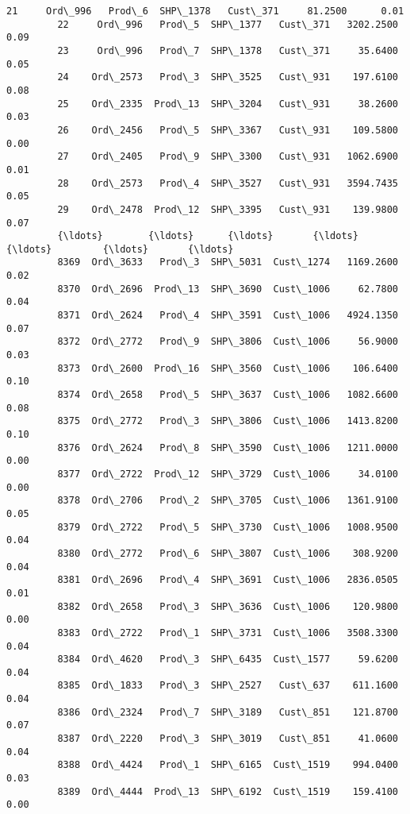 \documentclass[11pt]{article}
\begin{document}
\begin{Verbatim}[commandchars=\\\{\}]
         21     Ord\_996   Prod\_6  SHP\_1378   Cust\_371     81.2500      0.01   
         22     Ord\_996   Prod\_5  SHP\_1377   Cust\_371   3202.2500      0.09   
         23     Ord\_996   Prod\_7  SHP\_1378   Cust\_371     35.6400      0.05   
         24    Ord\_2573   Prod\_3  SHP\_3525   Cust\_931    197.6100      0.08   
         25    Ord\_2335  Prod\_13  SHP\_3204   Cust\_931     38.2600      0.03   
         26    Ord\_2456   Prod\_5  SHP\_3367   Cust\_931    109.5800      0.00   
         27    Ord\_2405   Prod\_9  SHP\_3300   Cust\_931   1062.6900      0.01   
         28    Ord\_2573   Prod\_4  SHP\_3527   Cust\_931   3594.7435      0.05   
         29    Ord\_2478  Prod\_12  SHP\_3395   Cust\_931    139.9800      0.07   
         {\ldots}        {\ldots}      {\ldots}       {\ldots}        {\ldots}         {\ldots}       {\ldots}   
         8369  Ord\_3633   Prod\_3  SHP\_5031  Cust\_1274   1169.2600      0.02   
         8370  Ord\_2696  Prod\_13  SHP\_3690  Cust\_1006     62.7800      0.04   
         8371  Ord\_2624   Prod\_4  SHP\_3591  Cust\_1006   4924.1350      0.07   
         8372  Ord\_2772   Prod\_9  SHP\_3806  Cust\_1006     56.9000      0.03   
         8373  Ord\_2600  Prod\_16  SHP\_3560  Cust\_1006    106.6400      0.10   
         8374  Ord\_2658   Prod\_5  SHP\_3637  Cust\_1006   1082.6600      0.08   
         8375  Ord\_2772   Prod\_3  SHP\_3806  Cust\_1006   1413.8200      0.10   
         8376  Ord\_2624   Prod\_8  SHP\_3590  Cust\_1006   1211.0000      0.00   
         8377  Ord\_2722  Prod\_12  SHP\_3729  Cust\_1006     34.0100      0.00   
         8378  Ord\_2706   Prod\_2  SHP\_3705  Cust\_1006   1361.9100      0.05   
         8379  Ord\_2722   Prod\_5  SHP\_3730  Cust\_1006   1008.9500      0.04   
         8380  Ord\_2772   Prod\_6  SHP\_3807  Cust\_1006    308.9200      0.04   
         8381  Ord\_2696   Prod\_4  SHP\_3691  Cust\_1006   2836.0505      0.01   
         8382  Ord\_2658   Prod\_3  SHP\_3636  Cust\_1006    120.9800      0.00   
         8383  Ord\_2722   Prod\_1  SHP\_3731  Cust\_1006   3508.3300      0.04   
         8384  Ord\_4620   Prod\_3  SHP\_6435  Cust\_1577     59.6200      0.04   
         8385  Ord\_1833   Prod\_3  SHP\_2527   Cust\_637    611.1600      0.04   
         8386  Ord\_2324   Prod\_7  SHP\_3189   Cust\_851    121.8700      0.07   
         8387  Ord\_2220   Prod\_3  SHP\_3019   Cust\_851     41.0600      0.04   
         8388  Ord\_4424   Prod\_1  SHP\_6165  Cust\_1519    994.0400      0.03   
         8389  Ord\_4444  Prod\_13  SHP\_6192  Cust\_1519    159.4100      0.00   

\end{Verbatim}
\end{document}
